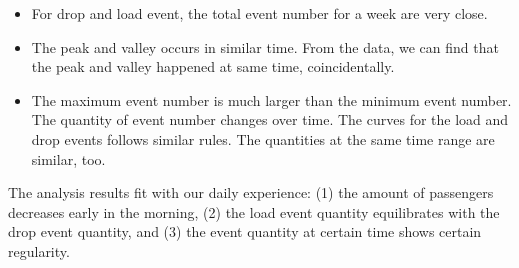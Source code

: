 \begin{itemize}
  \item For drop and load event, the total event number for a week are very close. \\
  \item The peak and valley occurs in similar time. From the data, we can find that the peak and valley happened at same time, coincidentally.
  \item The maximum event number is much larger than the minimum event number. The quantity of event number changes over time. The curves for the load and drop events follows similar rules. The quantities at the same time range are similar, too.
\end{itemize}

The analysis results fit with our daily experience: (1) the amount of passengers decreases early in the morning, (2) the load event quantity equilibrates with the drop event quantity, and (3) the event quantity at certain time shows certain regularity. 

